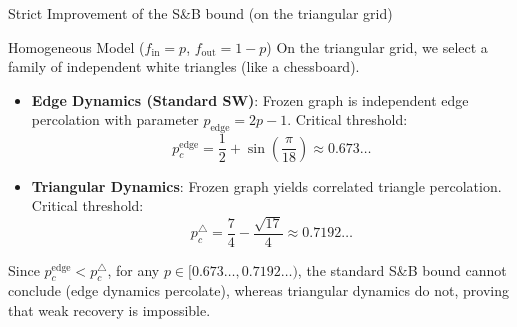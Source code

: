 \documentclass[A4,svgnames,9pt,aspectratio=169]{beamer}
\begin{document}
\begin{frame}{Strict Improvement of the \textsc{S}\&\textsc{B} bound (on the triangular grid)}
  \begin{block}{Homogeneous Model ($f_{\mathrm{in}} = p$, $f_{\mathrm{out}} = 1-p$)}
    On the triangular grid, we select a family of independent white triangles (like a chessboard).
    \begin{itemize}
      \item \textbf{Edge Dynamics (Standard SW)}:
        Frozen graph is independent edge percolation with parameter $p_{\mathrm{edge}} = 2p-1$.
        Critical threshold:
        $$p_c^{\mathrm{edge}} = \frac{1}{2} + \sin\left(\frac{\pi}{18}\right) \approx 0.673\ldots$$
      \item \textbf{Triangular Dynamics}:
        Frozen graph yields correlated triangle percolation.
        Critical threshold:
        $$p_c^{\triangle} = \frac{7}{4} - \frac{\sqrt{17}}{4} \approx 0.7192\ldots$$
    \end{itemize}
  \end{block}
  \begin{corollary}
    Since $p_c^{\mathrm{edge}} < p_c^{\triangle}$, for any $p \in [0.673\ldots, 0.7192\ldots)$, the standard \textsc{S}\&\textsc{B} bound cannot conclude (edge dynamics percolate), whereas triangular dynamics do not, proving that weak recovery is impossible.
  \end{corollary}
\end{frame}
\end{document}
